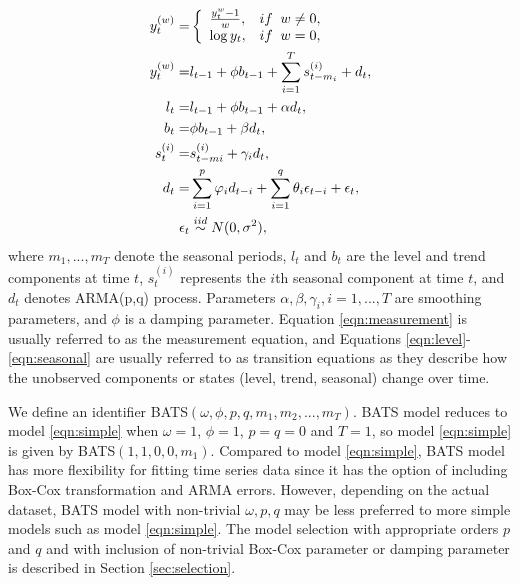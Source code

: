 \documentclass{uwstat572}
\begin{document}
\begin{subequations}
\begin{align}
y_t^{  (w)} = &\left\{
\begin{array}{l l}
\frac{y_t^{w}-1}{w}, & if \;\; w \neq 0,\\
\log y_t, & if\;\; w=0,\\
\end{array} \right. \\
y_t^{  (w)}=&l_{t-1}+\phi b_{t-1} +\sum\limits_{i=1}^T s_{t-m_i}^{(i)}+d_t, \label{eqn:measurement} \\
l_t=&l_{t-1}+\phi b_{t-1}+\alpha d_t,\label{eqn:level}  \\
 b_t=&\phi b_{t-1}+\beta d_t, \label{eqn:trend} \\
 s_t^{(i)}=&s_{t-mi}^{(i)}+\gamma_i d_t, \label{eqn:seasonal} \\
 d_t=&\sum\limits_{i=1}^p \varphi_id_{t-i} +\sum\limits_{i=1}^q \theta_i \epsilon_{t-i}+\epsilon_t, \\
 \epsilon_t &  \stackrel{iid}{\sim} N(0,\sigma^2),
\end{align}
\end{subequations}
\noindent where $m_1,..., m_T$ denote the seasonal periods, $l_t$ and $b_t$ are the level and trend components at time $t$, $s_t^{(i)}$ represents the $i$th seasonal component at time $t$, and $d_t$ denotes ARMA(p,q) process. Parameters $\alpha, \beta, \gamma_i, i=1,...,T$ are smoothing parameters, and $\phi$ is a damping parameter. Equation \ref{eqn:measurement} is usually referred to as the measurement equation, and Equations \ref{eqn:level}-\ref{eqn:seasonal} are usually referred to as transition equations as they describe how the unobserved components or states (level, trend, seasonal) change over time. 

We define an identifier BATS$( \omega, \phi, p, q, m_1, m_2, ..., m_T )$. BATS model reduces to model \ref{eqn:simple} when $\omega=1$, $\phi=1$, $p=q=0$ and $T=1$, so model \ref{eqn:simple} is given by BATS$(1,1,0,0, m_1)$. Compared to model \ref{eqn:simple}, BATS model has more flexibility for fitting time series data since it has the option of including Box-Cox transformation and ARMA errors. However, depending on the actual dataset, BATS model with non-trivial $\omega, p, q$ may be less preferred to more simple models such as model \ref{eqn:simple}. The model selection with appropriate orders $p$ and $q$ and with inclusion of non-trivial Box-Cox parameter or damping parameter is described in Section \ref{sec:selection}. 
\end{document}
